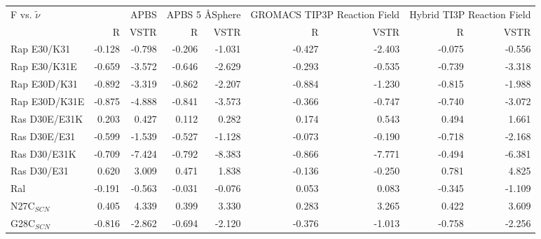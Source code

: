 \documentclass[landscape]{article}
\begin{document}
{
\begin{tabular}{ l || r r | r r | r r | r r}
F vs. $\tilde \nu$ & \multicolumn{2}{|C{2cm}}{APBS} & \multicolumn{2}{|C{2cm}}{APBS 5 \AA  Sphere} & \multicolumn{2}{|C{2cm}}{GROMACS TIP3P Reaction Field} & \multicolumn{2}{|C{2cm}}{Hybrid TI3P Reaction Field} \\
 & \multicolumn{1}{|C{1cm}}{R} & \multicolumn{1}{C{1cm}}{VSTR} & \multicolumn{1}{|C{1cm}}{R} & \multicolumn{1}{C{1cm}}{VSTR} & \multicolumn{1}{|C{1cm}}{R} & \multicolumn{1}{C{1cm}}{VSTR} & \multicolumn{1}{|C{1cm}}{R} & \multicolumn{1}{C{1cm}}{VSTR} \\
\hline\hline
Rap E30/K31    & -0.128         & -0.798         & -0.206         & -1.031         & -0.427         & -2.403         & -0.075         & -0.556        \\
Rap E30/K31E   & -0.659         & -3.572         & -0.646         & -2.629         & -0.293         & -0.535         & -0.739         & -3.318        \\
Rap E30D/K31   & -0.892         & -3.319         & -0.862         & -2.207         & -0.884         & -1.230         & -0.815         & -1.988        \\
Rap E30D/K31E  & -0.875         & -4.888         & -0.841         & -3.573         & -0.366         & -0.747         & -0.740         & -3.072        \\
Ras D30E/E31K  & 0.203          & 0.427          & 0.112          & 0.282          & 0.174          & 0.543          & 0.494          & 1.661         \\
Ras D30E/E31   & -0.599         & -1.539         & -0.527         & -1.128         & -0.073         & -0.190         & -0.718         & -2.168        \\
Ras D30/E31K   & -0.709         & -7.424         & -0.792         & -8.383         & -0.866         & -7.771         & -0.494         & -6.381        \\
Ras D30/E31    & 0.620          & 3.009          & 0.471          & 1.838          & -0.136         & -0.250         & 0.781          & 4.825         \\
Ral            & -0.191         & -0.563         & -0.031         & -0.076         & 0.053          & 0.083          & -0.345         & -1.109        \\
\hline
N27C$_{SCN}$   & 0.405          & 4.339          & 0.399          & 3.330          & 0.283          & 3.265          & 0.422          & 3.609         \\
G28C$_{SCN}$   & -0.816         & -2.862         & -0.694         & -2.120         & -0.376         & -1.013         & -0.758         & -2.256        \\

\end{tabular}}
\end{document}
